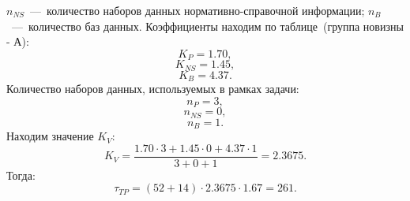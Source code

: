             $n_{NS}$~---~количество наборов данных нормативно-справочной информации;
            $n_B$~---~количество баз данных.
            Коэффициенты находим по таблице~(группа новизны - А):
            \begin{equation*}
                K_P=1.70,
            \end{equation*}
            \begin{equation*}
                K_{NS}=1.45,
            \end{equation*}
            \begin{equation*}
                K_B=4.37.
            \end{equation*}
            Количество наборов данных, используемых в рамках задачи:
            \begin{equation*}
                n_P=3,
            \end{equation*}
            \begin{equation*}
                n_{NS}=0,
            \end{equation*}
            \begin{equation*}
                n_B=1.
            \end{equation*}
            Находим значение $K_V$:
            \begin{equation*}
                K_V = \dfrac{1.70 \cdot 3+1.45 \cdot 0+4.37 \cdot 1}{3+0+1}=2.3675.
            \end{equation*}
            Тогда:
            \begin{equation*}
                \tau_{TP} = (52+14) \cdot 2.3675 \cdot 1.67 = 261.
            \end{equation*}

